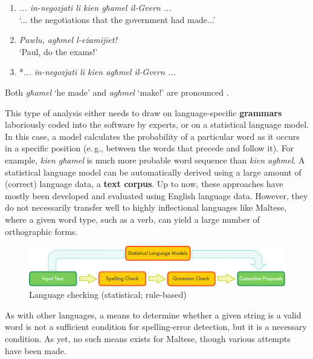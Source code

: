 \documentclass[]{../../metanetpaper}
\begin{document}
\begin{multicols}{2}
\begin{enumerate} %
\item \emph{... in-negozjati li kien għamel il-Gvern ...}\\
`... the negotiations that the government had made...'

\item \emph{Pawlu, agħmel l-eżamijiet!} \\
`Paul, do the exams!'

\item *\emph{... in-negozjati li kien agħmel il-Gvern ...}
\end{enumerate}
 
Both \emph{għamel} `he made' and \emph{agħmel} `make!' are pronounced .

This type of analysis either needs to draw on language-specific \textbf{grammars} laboriously coded into the software by experts, or on a statistical language model. In this case, a model calculates the probability of a particular word as it occurs in a specific position (e.\,g., between the words that precede and follow it). For example, \emph{kien għamel} is much more probable word sequence than \emph{kien agħmel}. A statistical language model can be automatically derived using a large amount of (correct) language data, a \textbf{text corpus}. Up to now, these approaches have mostly been developed and evaluated using English language data. However, they do not necessarily transfer well to highly inflectional languages like Maltese, where a given word type, such as a verb, can yield a large number of orthographic forms. 

\begin{figure}[htb]
  \center
  \includegraphics[width=\textwidth]{../_media/english/language_checking}
  \caption{Language checking (statistical; rule-based)}
  \label{fig:langcheckingaarch_en}
\end{figure}

As with other languages, a means to determine whether a given string is a valid word is not a sufficient condition for spelling-error detection, but it is a necessary condition. As yet, no such means exists for Maltese, though various attempts have been made. 


\end{multicols}
\end{document}
